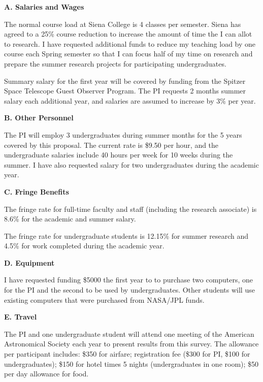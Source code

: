 \documentclass[preprint,11pt]{aastex}
\begin{document}
\begin{center}
{\bf \large A. Salaries and Wages}
\end{center}

The normal course load at Siena College is 4 classes per semester.  Siena
has agreed to a 25\% course reduction to increase the amount of time the 
I can allot to research.  I have requested additional funds to reduce
my teaching load by one course each Spring semester so that I can
focus half of my time on research and prepare the summer research
projects for participating undergraduates.

Summary salary for the first year will be covered 
by funding from the Spitzer Space Telescope Guest Observer Program.  
The PI requests 2 months summer salary each additional year, and 
salaries are assumed to increase by 3\% per year.

\begin{center}
{\bf \large B. Other Personnel}
\end{center}

The PI will employ 3 undergraduates during summer months
for the 5 years covered by this proposal.  The current rate is \$9.50
per hour, and the undergraduate salaries include 40 hours per week 
for 10 weeks during the summer.  I have also requested salary for 
two undergraduates during the academic year.

\begin{center}
{\bf \large C. Fringe Benefits}
\end{center}

The fringe rate for full-time faculty and staff (including the research associate) 
is 8.6\% for the academic and summer salary.

The fringe rate for undergraduate students is 
12.15\% for summer research and 4.5\% for work completed during the
academic year.

\begin{center}
{\bf \large D. Equipment}
\end{center}

I have requested funding \$5000 the first year to 
to purchase two computers, one for the PI and the second to be used by undergraduates.  
Other students
will use existing computers that were purchased
from NASA/JPL funds.

\begin{center}
{\bf \large E. Travel}
\end{center}

The PI and
one undergraduate student will attend 
one meeting of the American Astronomical
Society each year to present results from this survey.  
The allowance per participant 
includes: \$350 for airfare; registration fee (\$300 for PI, 
\$100 for undergraduates); \$150 for hotel times 5 nights
(undergraduates in one room); \$50 per day allowance for food.  
\end{document}
